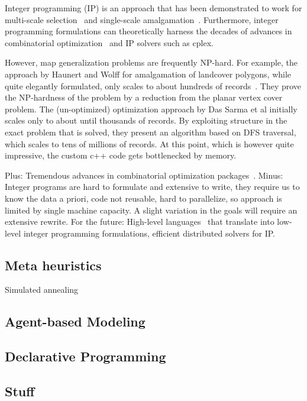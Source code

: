 \documentclass[11pt, oneside]{report}
\begin{document}
Integer programming (IP) is an approach that has been demonstrated to work for multi-scale selection~\cite{sarma2012fusiontables} and single-scale amalgamation~\cite{haunert2006landcover}. Furthermore, integer programming formulations can theoretically harness the decades of advances in combinatorial optimization~\cite{branchandbound} and IP solvers such as cplex.

However, map generalization problems are frequently NP-hard. For example, the approach by Haunert and Wolff for amalgamation of landcover polygons, while quite elegantly formulated, only scales to about hundreds of records~\cite{haunert2006landcover}. They prove the NP-hardness of the problem by a reduction from the planar vertex cover problem. The (un-optimized) optimization approach by Das Sarma et al initially scales only to about until thousands of records. By exploiting structure in the exact problem that is solved, they present an algorithm based on DFS traversal, which scales to tens of millions of records. At this point, which is however quite impressive, the custom c++ code gets bottlenecked by memory.

Plus: Tremendous advances in combinatorial optimization packages~\cite{cplex}.
Minus: Integer programs are hard to formulate and extensive to write, they require us to know the data a priori, code not reusable, hard to parallelize, so approach is limited by single machine capacity. A slight variation in the goals will require an extensive rewrite.
For the future: High-level languages~\cite{meliou2011reverse} that translate into low-level integer programming formulations, efficient distributed solvers for IP.

\subsection{Meta heuristics}

Simulated annealing~\cite{ware2003generalization_sa}

\subsection{Agent-based Modeling}

\subsection{Declarative Programming}

\subsection{Stuff}
\end{document}
